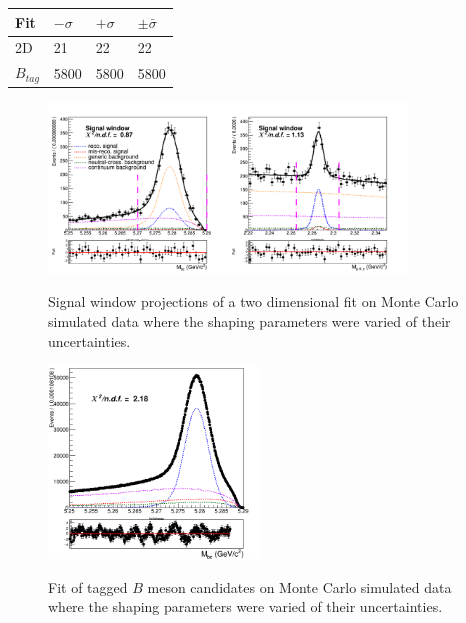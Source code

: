 \begin{tabular}{ |p{2.5cm}||p{2cm}| p{2cm}|  p{2cm}|}
\hline
    Fit    &  $- \sigma$ &  $+ \sigma$ & $ \pm \bar{\sigma}$\\
 \hline
 2D        &     21  & 22  & 22 \\
 $B_{tag}$ &  5800 &  5800 & 5800 \\
 \hline
\end{tabular}

\begin{figure}[H]
\centering
{\includegraphics[width=0.85\textwidth]{06-chargedAnticorrBtoLambda/figs/Signal_window_Total_2DFit_stream5_chargedAnticorrLambdaC_MinusNcontinuum.png}}
\caption{Signal window projections of a two dimensional fit on Monte Carlo simulated data where the shaping parameters were varied of their uncertainties.}
\label{fig:Signal_window_Total_2DFit_stream5_chargedAnticorrLambdaC_MinusNcontinuum}
\end{figure}

\begin{figure}[H]
\centering
{\includegraphics[width=0.5\textwidth]{06-chargedAnticorrBtoLambda/figs/stream1_chargedBtag_AnticorrTotal_fit_ContinuumSys_Plus.png}}
\caption{Fit of tagged $B$ meson candidates on Monte Carlo simulated data where the shaping parameters were varied of their uncertainties.}
\label{fig:stream1_chargedBtag_AnticorrTotal_fit_ContinuumSys_Plus}
\end{figure}




